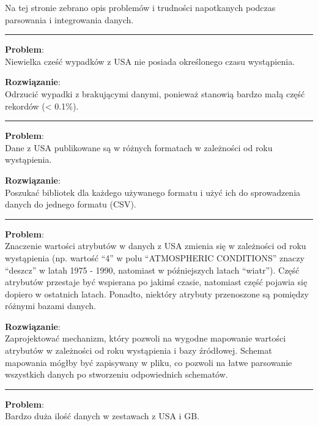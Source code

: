 Na tej stronie zebrano opis problemów i trudności napotkanych podczas
parsowania i integrowania danych.

\begin{center}\rule{3in}{0.4pt}\end{center}

\textbf{Problem}:\\Niewielka cześć wypadków z USA nie posiada
określonego czasu wystąpienia.

\textbf{Rozwiązanie}:\\Odrzucić wypadki z brakującymi danymi, ponieważ
stanowią bardzo małą część rekordów (\textless{} 0.1\%).

\begin{center}\rule{3in}{0.4pt}\end{center}

\textbf{Problem}:\\Dane z USA publikowane są w różnych formatach w
zależności od roku wystąpienia.

\textbf{Rozwiązanie}:\\Poszukać bibliotek dla każdego używanego formatu
i użyć ich do sprowadzenia danych do jednego formatu (CSV).

\begin{center}\rule{3in}{0.4pt}\end{center}

\textbf{Problem}:\\Znaczenie wartości atrybutów w danych z USA zmienia
się w zależności od roku wystąpienia (np. wartość ``4'' w polu
``ATMOSPHERIC CONDITIONS'' znaczy ``deszcz'' w latah 1975 - 1990,
natomiast w późniejszych latach ``wiatr''). Część atrybutów przestaje
być wspierana po jakimś czasie, natomiast część pojawia się dopiero w
ostatnich latach. Ponadto, niektóry atrybuty przenoszone są pomiędzy
różnymi bazami danych.

\textbf{Rozwiązanie}:\\Zaprojektować mechanizm, który pozwoli na wygodne
mapowanie wartości atrybutów w zależności od roku wystąpienia i bazy
źródłowej. Schemat mapowania mógłby być zapisywany w pliku, co pozwoli
na łatwe parsowanie wszystkich danych po stworzeniu odpowiednich
schematów.

\begin{center}\rule{3in}{0.4pt}\end{center}

\textbf{Problem}:\\Bardzo duża ilość danych w zestawach z USA i GB.

